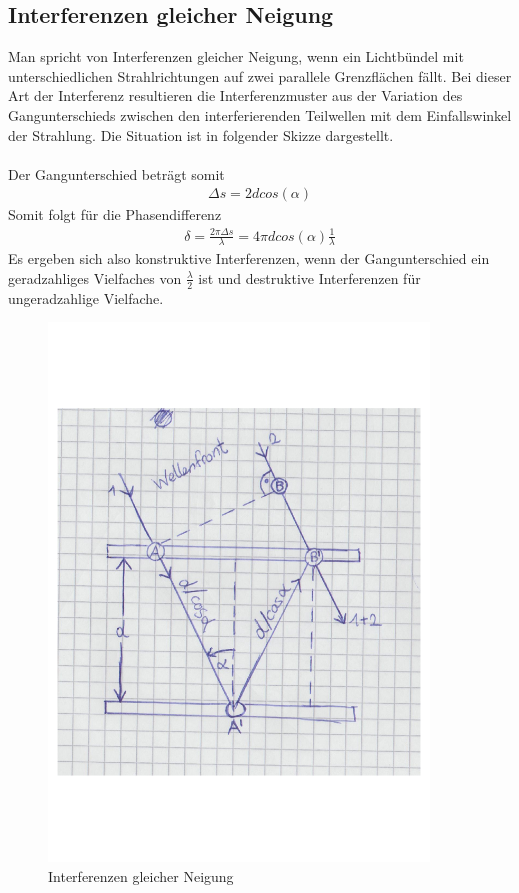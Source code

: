 \documentclass[a4paper,10pt]{scrartcl}
\begin{document}
	\subsection{Interferenzen gleicher Neigung}
	Man spricht von Interferenzen gleicher Neigung, wenn ein Lichtbündel mit unterschiedlichen Strahlrichtungen
	auf zwei parallele Grenzflächen fällt. Bei dieser Art der Interferenz resultieren die Interferenzmuster aus der Variation
	des Gangunterschieds zwischen den interferierenden Teilwellen mit dem Einfallswinkel der Strahlung. Die Situation ist in folgender Skizze dargestellt.\\
	\\
	Der Gangunterschied beträgt somit
	\begin{align*}
	\Delta s=2dcos(\alpha)
	\end{align*}
	Somit folgt für die Phasendifferenz
	\begin{align*}
	\delta=\frac{2\pi \Delta s}{\lambda}=4\pi d cos(\alpha)\frac{1}{\lambda}
	\end{align*}
	Es ergeben sich also konstruktive Interferenzen, wenn der Gangunterschied ein geradzahliges Vielfaches von \(\frac{\lambda}{2}\) ist und destruktive Interferenzen für ungeradzahlige Vielfache.
	\begin{figure}[h]
\centering
\includegraphics[width=0.9\textwidth]{./Bilder/fp2}
\caption{Interferenzen gleicher Neigung}
\end{figure}
\FloatBarrier
	
\end{document}
